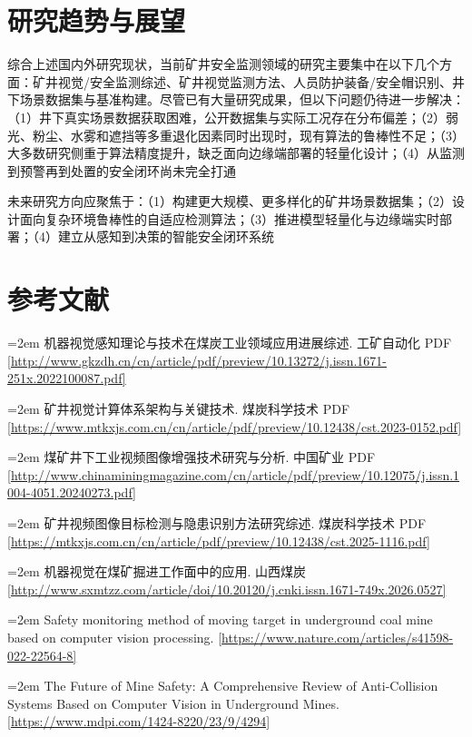 \documentclass[UTF8,zihao=-4,fontset=fandol]{ctexart}
\begin{document}
\section{研究趋势与展望}
综合上述国内外研究现状，当前矿井安全监测领域的研究主要集中在以下几个方面：矿井视觉/安全监测综述、矿井视觉监测方法、人员防护装备/安全帽识别、井下场景数据集与基准构建。尽管已有大量研究成果，但以下问题仍待进一步解决：（1）井下真实场景数据获取困难，公开数据集与实际工况存在分布偏差；（2）弱光、粉尘、水雾和遮挡等多重退化因素同时出现时，现有算法的鲁棒性不足；（3）大多数研究侧重于算法精度提升，缺乏面向边缘端部署的轻量化设计；（4）从监测到预警再到处置的安全闭环尚未完全打通

未来研究方向应聚焦于：（1）构建更大规模、更多样化的矿井场景数据集；（2）设计面向复杂环境鲁棒性的自适应检测算法；（3）推进模型轻量化与边缘端实时部署；（4）建立从感知到决策的智能安全闭环系统

\section*{参考文献}

\hangindent=2em  \noindent [1] 机器视觉感知理论与技术在煤炭工业领域应用进展综述.  工矿自动化 PDF  [\url{http://www.gkzdh.cn/cn/article/pdf/preview/10.13272/j.issn.1671-251x.2022100087.pdf]}

\hangindent=2em  \noindent [2] 矿井视觉计算体系架构与关键技术.  煤炭科学技术 PDF  [\url{https://www.mtkxjs.com.cn/cn/article/pdf/preview/10.12438/cst.2023-0152.pdf]}

\hangindent=2em  \noindent [3] 煤矿井下工业视频图像增强技术研究与分析.  中国矿业 PDF  [\url{http://www.chinaminingmagazine.com/cn/article/pdf/preview/10.12075/j.issn.1004-4051.20240273.pdf]}

\hangindent=2em  \noindent [4] 矿井视频图像目标检测与隐患识别方法研究综述.  煤炭科学技术 PDF  [\url{https://mtkxjs.com.cn/cn/article/pdf/preview/10.12438/cst.2025-1116.pdf]}

\hangindent=2em  \noindent [5] 机器视觉在煤矿掘进工作面中的应用.  山西煤炭  [\url{http://www.sxmtzz.com/article/doi/10.20120/j.cnki.issn.1671-749x.2026.0527]}

\hangindent=2em  \noindent [6] Safety monitoring method of moving target in underground coal mine based on computer vision processing.  [\url{https://www.nature.com/articles/s41598-022-22564-8]}

\hangindent=2em  \noindent [7] The Future of Mine Safety: A Comprehensive Review of Anti-Collision Systems Based on Computer Vision in Underground Mines.  [\url{https://www.mdpi.com/1424-8220/23/9/4294]}
\end{document}
